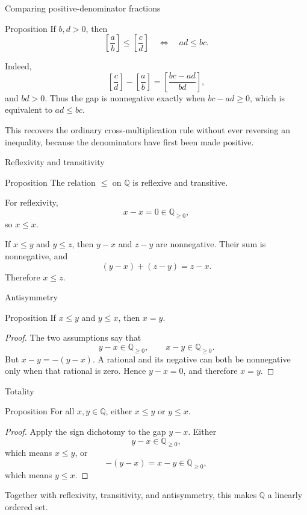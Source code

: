 \documentclass[aspectratio=169,11pt]{beamer}
\newcommand{\Q}{\mathbb Q}
\newcommand{\qcl}[2]{\left[\frac{#1}{#2}\right]}
\begin{document}
\begin{frame}{Comparing positive-denominator fractions}
  \small
  \begin{block}{Proposition}
    If \(b,d>0\), then
    \[
      \boxed{
      \qcl ab\le\qcl cd
      \quad\Longleftrightarrow\quad
      ad\le bc.}
    \]
  \end{block}

  Indeed,
  \[
    \qcl cd-\qcl ab=\qcl{bc-ad}{bd},
  \]
  and \(bd>0\).  Thus the gap is nonnegative exactly when
  \(bc-ad\ge0\), which is equivalent to \(ad\le bc\).

  This recovers the ordinary cross-multiplication rule without ever reversing
  an inequality, because the denominators have first been made positive.
\end{frame}

\begin{frame}{Reflexivity and transitivity}
  \begin{block}{Proposition}
    The relation \(\le\) on \(\Q\) is reflexive and transitive.
  \end{block}

  For reflexivity,
  \[
    x-x=0\in\Q_{\ge0},
  \]
  so \(x\le x\).

  If \(x\le y\) and \(y\le z\), then \(y-x\) and \(z-y\) are
  nonnegative.  Their sum is nonnegative, and
  \[
    (y-x)+(z-y)=z-x.
  \]
  Therefore \(x\le z\).
\end{frame}

\begin{frame}{Antisymmetry}
  \begin{block}{Proposition}
    If \(x\le y\) and \(y\le x\), then \(x=y\).
  \end{block}

  \begin{proof}
    The two assumptions say that
    \[
      y-x\in\Q_{\ge0},
      \qquad
      x-y\in\Q_{\ge0}.
    \]
    But \(x-y=-(y-x)\).  A rational and its negative can both be
    nonnegative only when that rational is zero.  Hence \(y-x=0\), and
    therefore \(x=y\).
  \end{proof}
\end{frame}

\begin{frame}{Totality}
  \begin{block}{Proposition}
    For all \(x,y\in\Q\), either \(x\le y\) or \(y\le x\).
  \end{block}

  \begin{proof}
    Apply the sign dichotomy to the gap \(y-x\).  Either
    \[
      y-x\in\Q_{\ge0},
    \]
    which means \(x\le y\), or
    \[
      -(y-x)=x-y\in\Q_{\ge0},
    \]
    which means \(y\le x\).
  \end{proof}

  Together with reflexivity, transitivity, and antisymmetry, this makes
  \(\Q\) a linearly ordered set.
\end{frame}
\end{document}
